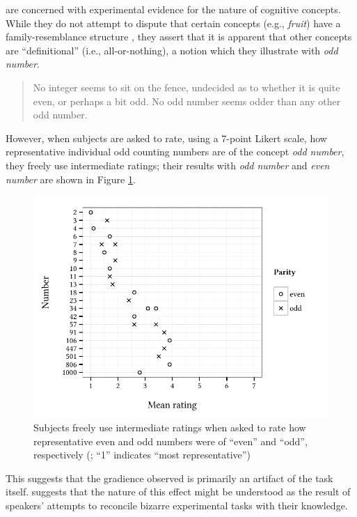 \citet{Armstrong1983} are concerned with experimental evidence for the nature of cognitive concepts. 
While they do not attempt to dispute that certain concepts (e.g., \emph{fruit}) have a family-resemblance structure \citep[e.g.,][]{Rosch1975a}, they assert that it is apparent that other concepts are ``definitional'' (i.e., all-or-nothing), a notion which they illustrate with \emph{odd number}.

\begin{quote}
No integer seems to sit on the fence, undecided as to whether it is quite even, or perhaps a bit odd. No odd number seems odder than any other odd number. \citep[274]{Armstrong1983}
\end{quote}

\noindent
However, when subjects are asked to rate, using a 7-point Likert scale, how representative individual odd counting numbers are of the concept \emph{odd number}, they freely use intermediate ratings; their results with \emph{odd number} and \emph{even number} are shown in Figure \ref{agg}.

\begin{figure}
\centering
\includegraphics{agg.pdf}
\caption{Subjects freely use intermediate ratings when asked to rate how representative even and odd numbers were of ``even'' and ``odd'', respectively (\citealp{Armstrong1983}; ``1'' indicates ``most representative'')}
\label{agg}
\end{figure}

This suggests that the gradience observed is primarily an artifact of the task itself. \citeauthor{Schutze2011} suggests that the nature of this effect might be understood as the result of speakers' attempts to reconcile bizarre experimental tasks with their knowledge.

